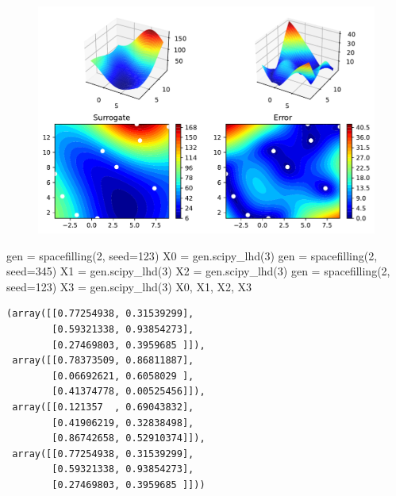 \documentclass[
  letterpaper,
  DIV=11,
  numbers=noendperiod]{scrreprt}
\newenvironment{Shaded}{\begin{snugshade}}{\end{snugshade}}
\newcommand{\DecValTok}[1]{\textcolor[rgb]{0.68,0.00,0.00}{#1}}
\newcommand{\NormalTok}[1]{\textcolor[rgb]{0.00,0.23,0.31}{#1}}
\newcommand{\OperatorTok}[1]{\textcolor[rgb]{0.37,0.37,0.37}{#1}}
\begin{document}
\begin{figure}[H]

{\centering \includegraphics{07_spot_ei_files/figure-pdf/cell-22-output-1.pdf}

}

\end{figure}

\begin{Shaded}
\begin{Highlighting}[]
\NormalTok{gen }\OperatorTok{=}\NormalTok{ spacefilling(}\DecValTok{2}\NormalTok{, seed}\OperatorTok{=}\DecValTok{123}\NormalTok{)}
\NormalTok{X0 }\OperatorTok{=}\NormalTok{ gen.scipy\_lhd(}\DecValTok{3}\NormalTok{)}
\NormalTok{gen }\OperatorTok{=}\NormalTok{ spacefilling(}\DecValTok{2}\NormalTok{, seed}\OperatorTok{=}\DecValTok{345}\NormalTok{)}
\NormalTok{X1 }\OperatorTok{=}\NormalTok{ gen.scipy\_lhd(}\DecValTok{3}\NormalTok{)}
\NormalTok{X2 }\OperatorTok{=}\NormalTok{ gen.scipy\_lhd(}\DecValTok{3}\NormalTok{)}
\NormalTok{gen }\OperatorTok{=}\NormalTok{ spacefilling(}\DecValTok{2}\NormalTok{, seed}\OperatorTok{=}\DecValTok{123}\NormalTok{)}
\NormalTok{X3 }\OperatorTok{=}\NormalTok{ gen.scipy\_lhd(}\DecValTok{3}\NormalTok{)}
\NormalTok{X0, X1, X2, X3}
\end{Highlighting}
\end{Shaded}

\begin{verbatim}
(array([[0.77254938, 0.31539299],
        [0.59321338, 0.93854273],
        [0.27469803, 0.3959685 ]]),
 array([[0.78373509, 0.86811887],
        [0.06692621, 0.6058029 ],
        [0.41374778, 0.00525456]]),
 array([[0.121357  , 0.69043832],
        [0.41906219, 0.32838498],
        [0.86742658, 0.52910374]]),
 array([[0.77254938, 0.31539299],
        [0.59321338, 0.93854273],
        [0.27469803, 0.3959685 ]]))
\end{verbatim}
\end{document}
